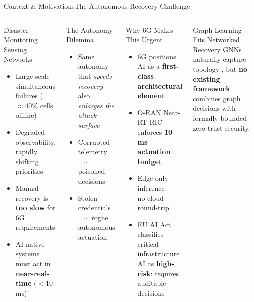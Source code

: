 \documentclass[aspectratio=169,10pt]{beamer}
\newcommand{\tightlist}{\setlength{\itemsep}{2pt}\setlength{\parskip}{0pt}\setlength{\topsep}{0pt}}
\begin{document}
\begin{frame}[t,shrink=18]{Context \& Motivations}{The Autonomous Recovery Challenge}
  \begin{columns}[t]
    \begin{block}{Disaster-Monitoring Sensing Networks}
      \begin{itemize}\tightlist
        \item Large-scale simultaneous failures (${\approx}40\%$ cells offline)
        \item Degraded observability, rapidly shifting priorities
        \item Manual recovery is \textbf{too slow} for 6G requirements
        \item AI-native systems must act in \textbf{near-real-time} (${<}10$\,ms) \cite{oran_official_architecture}
      \end{itemize}
    \end{block}
    \vspace{0.2cm}
    \begin{alertblock}{The Autonomy Dilemma}
      \begin{itemize}\tightlist
        \item Same autonomy that \emph{speeds recovery} also \emph{enlarges the attack surface}
        \item Corrupted telemetry $\Rightarrow$ poisoned decisions
        \item Stolen credentials $\Rightarrow$ rogue autonomous actuation \cite{amodei2016concrete,rose2020nist}
      \end{itemize}
    \end{alertblock}
    \begin{block}{Why 6G Makes This Urgent}
      \begin{itemize}\tightlist
        \item 6G positions AI as a \textbf{first-class architectural element} \cite{saad2020vision6g}
        \item O-RAN Near-RT RIC enforces \textbf{10\,ms actuation budget} \cite{oran_official_architecture}
        \item Edge-only inference — no cloud round-trip
        \item EU AI Act classifies critical-infrastructure AI as \textbf{high-risk}: requires auditable decisions \cite{euaiact2024}
      \end{itemize}
    \end{block}
    \vspace{0.2cm}
    \begin{exampleblock}{Graph Learning Fits Networked Recovery}
      GNNs naturally capture topology \cite{kipf2017gcn,hamilton2017graphsage,velickovic2018gat}, but \textbf{no existing framework} combines graph decisions with formally bounded zero-trust security.
    \end{exampleblock}
  \end{columns}
\end{frame}
\end{document}
